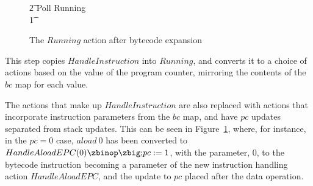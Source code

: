 \begin{figure}[t]
\begin{circus}
    \t2 \circfi \circseq Poll \circseq Running \\
    \t1 \circfi
  \end{circus}
  \caption{The $Running$ action after bytecode expansion}
  \label{bytecode-expansion-example-figure}
\end{figure}
This step copies $HandleInstruction$ into $Running$, and converts it
to a choice of actions based on the value of the program counter,
mirroring the contents of the $bc$ map for each value.

The actions that make up $HandleInstruction$ are also replaced with
actions that incorporate instruction parameters from the $bc$ map, and
have $pc$ updates separated from stack updates.
This can be seen in Figure~\ref{bytecode-expansion-example-figure},
where, for instance, in the $pc = 0$ case, $aload~0$ has been
converted to $HandleAloadEPC(0) \circseq pc := 1$, with the parameter,
$0$, to the bytecode instruction becoming a parameter of the new
instruction handling action $HandleAloadEPC$, and the update to $pc$
placed after the data operation.

